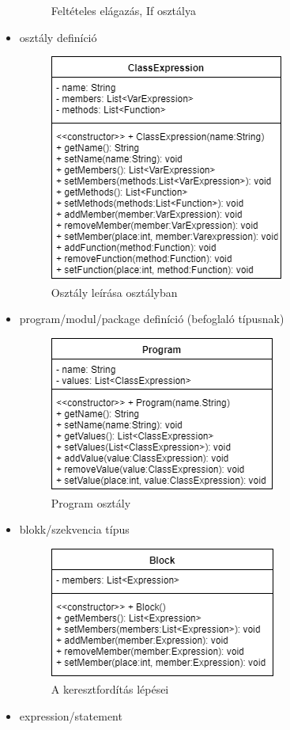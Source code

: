 \begin{itemize}
\begin{figure}
\caption{Feltételes elágazás, If osztálya}
\label{fig:process}
\end{figure}
\item osztály definíció
\begin{figure}
\centering
\includegraphics[scale=1]{kepek/rr_class_dia.png}
\caption{Osztály leírása osztályban}
\label{fig:process}
\end{figure}
\item program/modul/package definíció (befoglaló típusnak)
\begin{figure}
\centering
\includegraphics[scale=1]{kepek/rr_prog_dia.png}
\caption{Program osztály}
\label{fig:process}
\end{figure}
\item blokk/szekvencia típus
\begin{figure}
\centering
\includegraphics[scale=1]{kepek/rr_block_dia.png}
\caption{A keresztfordítás lépései}
\label{fig:process}
\end{figure}
\item expression/statement

\end{itemize}


